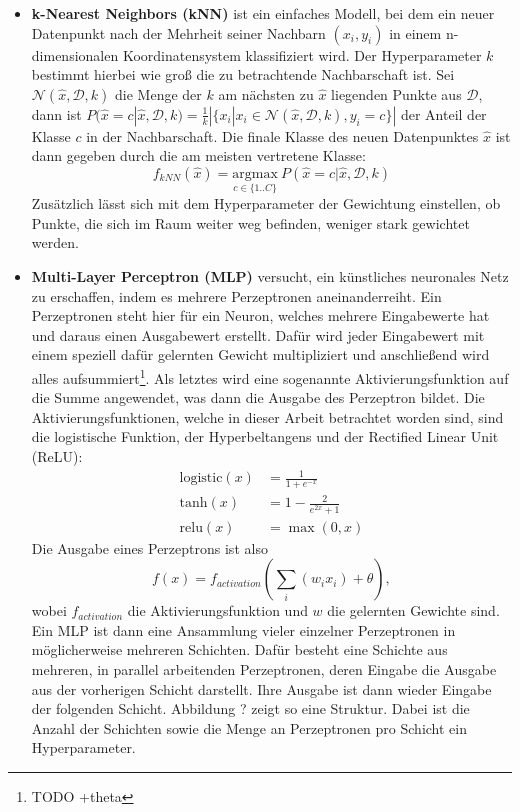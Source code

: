 \begin{itemize}

   \item \textbf{k-Nearest Neighbors (kNN)} ist ein einfaches Modell, bei dem ein neuer Datenpunkt nach der
    Mehrheit seiner Nachbarn $(x_i, y_i)$ in einem n-dimensionalen Koordinatensystem klassifiziert wird. Der
    Hyperparameter $k$ bestimmt hierbei wie groß die zu betrachtende Nachbarschaft ist. Sei
            $\mathcal{N}(\hat{x}, \mathcal{D}, k)$
    die Menge der $k$ am nächsten zu $\hat{x}$ liegenden Punkte aus $\mathcal{D}$, dann ist
            $P(\hat{x}=c|\hat{x}, \mathcal{D}, k) = \frac{1}{k} |\{x_i | x_i \in \mathcal{N}(\hat{x}, \mathcal{D}, k), y_i=c\}|$
    der Anteil der Klasse $c$ in der Nachbarschaft. Die finale Klasse des neuen Datenpunktes $\hat{x}$ ist dann
    gegeben durch die am meisten vertretene Klasse:
    \begin{equation}
            f_{kNN}(\hat{x}) = \underset{c \in \{1..C\}}{\mathrm{argmax}}\ P(\hat{x}=c|\hat{x}, \mathcal{D}, k)
    \end{equation}
    Zusätzlich lässt sich mit dem Hyperparameter der Gewichtung einstellen, ob Punkte, die sich im Raum weiter
    weg befinden, weniger stark gewichtet werden.

   \item \textbf{Multi-Layer Perceptron (MLP)} versucht, ein künstliches neuronales Netz zu erschaffen, indem es
    mehrere Perzeptronen aneinanderreiht. Ein Perzeptronen steht hier für ein Neuron, welches mehrere Eingabewerte
    hat und daraus einen Ausgabewert erstellt. Dafür wird jeder Eingabewert mit einem speziell dafür gelernten
    Gewicht multipliziert und anschließend wird alles aufsummiert\footnote{TODO +theta}. Als letztes wird eine
    sogenannte Aktivierungsfunktion auf die Summe angewendet, was dann die Ausgabe des Perzeptron bildet. Die
    Aktivierungsfunktionen, welche in dieser Arbeit betrachtet worden sind, sind die logistische
    Funktion, der Hyperbeltangens und der
    Rectified Linear Unit (ReLU):
    \begin{align}
        \text{logistic}(x) &= \frac{1}{1+e^{-x}}\\
        \text{tanh}(x)     &= 1-\frac{2}{e^{2x}+1}\\
        \text{relu}(x)     &= \max(0, x)
    \end{align}
    Die Ausgabe eines Perzeptrons ist also
    \begin{equation}
            f(x) = f_{activation}(\sum_i(w_ix_i)+\theta),
    \end{equation}
    wobei $f_{activation}$ die Aktivierungsfunktion und $w$ die gelernten Gewichte sind. Ein MLP ist dann eine
    Ansammlung vieler einzelner Perzeptronen in möglicherweise mehreren Schichten. Dafür besteht eine Schichte
    aus mehreren, in parallel arbeitenden Perzeptronen, deren Eingabe die Ausgabe aus der vorherigen Schicht
    darstellt. Ihre Ausgabe ist dann wieder Eingabe der folgenden Schicht. Abbildung ? zeigt so eine Struktur.
    Dabei ist die Anzahl der Schichten sowie die Menge an Perzeptronen pro Schicht ein Hyperparameter.


\end{itemize}
